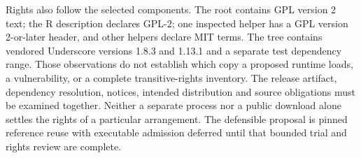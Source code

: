 Rights also follow the selected components. The root contains GPL version 2
text; the R description declares GPL-2; one inspected helper has a
GPL version 2-or-later header, and other helpers declare MIT terms. The tree
contains vendored Underscore versions 1.8.3 and 1.13.1 and a separate test
dependency range. Those observations do not establish which copy a proposed
runtime loads, a vulnerability, or a complete transitive-rights inventory.
The release artifact, dependency resolution, notices, intended distribution
and source obligations must be examined together. Neither a separate process
nor a public download alone settles the rights of a particular arrangement.
The defensible proposal is pinned reference reuse with executable admission
deferred until that bounded trial and rights review are complete.
\citep{exec18_gp_dagitty}
